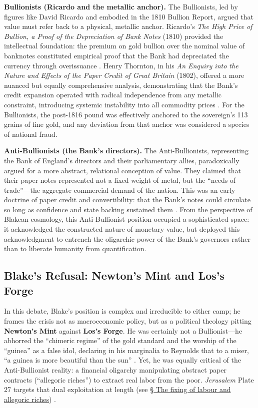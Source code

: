\documentclass[
]{article}
\begin{document}
\textbf{Bullionists (Ricardo and the metallic anchor).} The Bullionists,
led by figures like David Ricardo and embodied in the 1810 Bullion
Report, argued that value must refer back to a physical, metallic
anchor. Ricardo's \emph{The High Price of Bullion, a Proof of the
Depreciation of Bank Notes} (1810) provided the intellectual foundation:
the premium on gold bullion over the nominal value of banknotes
constituted empirical proof that the Bank had depreciated the currency
through overissuance \citep{ricardo1810high}. Henry Thornton, in his
\emph{An Enquiry into the Nature and Effects of the Paper Credit of
Great Britain} (1802), offered a more nuanced but equally comprehensive
analysis, demonstrating that the Bank's credit expansion operated with
radical independence from any metallic constraint, introducing systemic
instability into all commodity prices \citep{thornton1802nature}. For
the Bullionists, the post-1816 pound was effectively anchored to the
sovereign's 113 grains of fine gold, and any deviation from that anchor
was considered a species of national fraud.

\textbf{Anti-Bullionists (the Bank's directors).} The Anti-Bullionists,
representing the Bank of England's directors and their parliamentary
allies, paradoxically argued for a more abstract, relational conception
of value. They claimed that their paper notes represented not a fixed
weight of metal, but the ``needs of trade''---the aggregate commercial
demand of the nation. This was an early doctrine of paper credit and
convertibility: that the Bank's notes could circulate so long as
confidence and state backing sustained them
\citep{fetter1965development}. From the perspective of Blakean
cosmology, this Anti-Bullionist position occupied a sophisticated space:
it acknowledged the constructed nature of monetary value, but deployed
this acknowledgment to entrench the oligarchic power of the Bank's
governors rather than to liberate humanity from quantification.

\subsection{Blake's Refusal: Newton's Mint and Los's
Forge}\label{blakes-refusal-newtons-mint-and-loss-forge}

In this debate, Blake's position is complex and irreducible to either
camp; he frames the crisis not as macroeconomic policy, but as a
political theology pitting \textbf{Newton's Mint} against \textbf{Los's
Forge}. He was certainly not a Bullionist---he abhorred the ``chimeric
regime'' of the gold standard and the worship of the ``guinea'' as a
false idol, declaring in his marginalia to Reynolds that to a miser, ``a
guinea is more beautiful than the sun'' \citep{blake1808annotations}.
Yet, he was equally critical of the Anti-Bullionist reality: a financial
oligarchy manipulating abstract paper contracts (``allegoric riches'')
to extract real labor from the poor. \emph{Jerusalem} Plate 27 targets
that dual exploitation at length (see \hyperref[sec-allegoric-riches]{§
The fixing of labour and allegoric riches})
\citep{erdman1988complete, sklar2011blake}.
\end{document}
